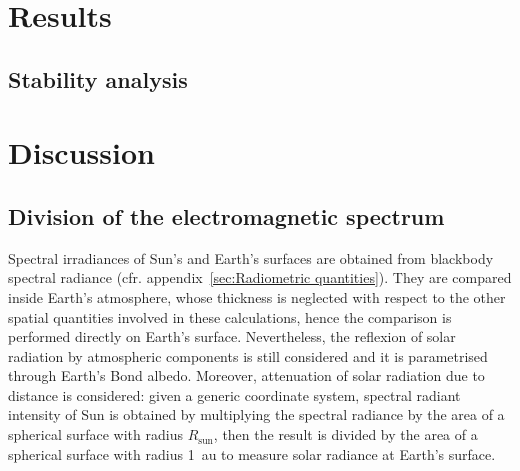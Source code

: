 \documentclass[a4paper,10pt,twocolumn,\classoptions]{article}
\begin{document}
\section{Results}



\subsection{Stability analysis}



\section{Discussion}



\subsection{Division of the electromagnetic spectrum}
\label{sec:Division of the electromagnetic spectrum}
Spectral irradiances of Sun's and Earth's surfaces are obtained from blackbody spectral radiance (cfr. appendix~\ref{sec:Radiometric quantities}). They are compared inside Earth's atmosphere, whose thickness is neglected with respect to the other spatial quantities involved in these calculations, hence the comparison is performed directly on Earth's surface. Nevertheless, the reflexion of solar radiation by atmospheric components is still considered and it is parametrised through Earth's Bond albedo. Moreover, attenuation of solar radiation due to distance is considered: given a generic coordinate system, spectral radiant intensity of Sun is obtained by multiplying the spectral radiance by the area of a spherical surface with radius $R_\text{sun}$, then the result is divided by the area of a spherical surface with radius \qty{1}{\astronomicalunit} to measure solar radiance at Earth's surface.
\end{document}
